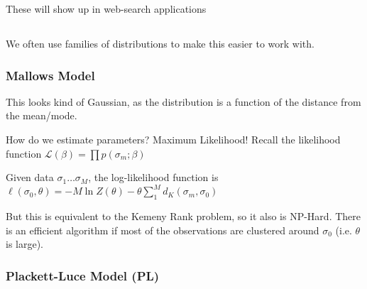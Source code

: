 \documentclass[twoside]{article}
\begin{document}


These will show up in web-search applications


\subsection*{}


We often use families of distributions to make this easier to work with.

\subsubsection*{Mallows Model}



This looks kind of Gaussian, as the distribution is a function of the distance from the mean/mode.

How do we estimate parameters? Maximum Likelihood!  Recall the likelihood function $\mathcal{L}(\beta) = \prod p(\sigma_m;\beta)$

Given data $\sigma_1 \dots \sigma_M$, the log-likelihood function is $\ell(\sigma_0,\theta) = -M\ln{Z(\theta)} - \theta \sum\limits_1^M d_K(\sigma_m,\sigma_0)$

But this is equivalent to the Kemeny Rank problem, so it also is NP-Hard.  There is an efficient algorithm if most of the observations are clustered around $\sigma_0$ (i.e. $\theta$ is large).

\subsubsection*{Plackett-Luce Model (PL)}
\end{document}
